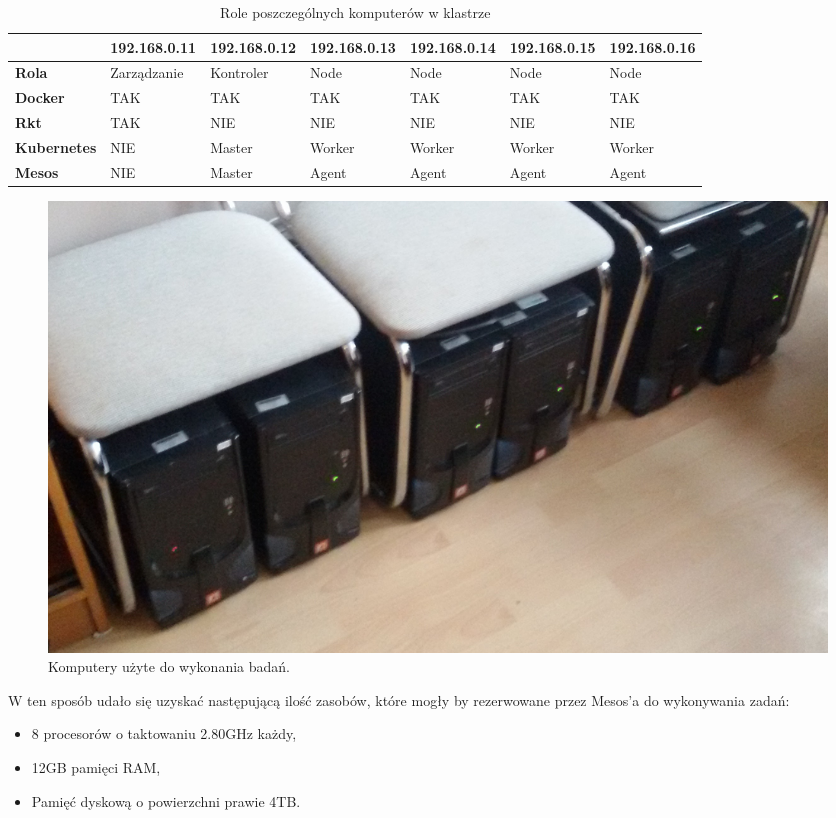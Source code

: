 \documentclass[10pt,a4paper,titlepage,twoside]{report}
\begin{document}
\begin{table}[!h]
\caption{Role poszczególnych komputerów w klastrze}
\label{klaster_magisterski}
\centering
\begin{tabular}{|p{2cm}|p{2cm}|p{2cm}|p{2cm}|p{2cm}|p{2cm}|p{2cm}|}
  \hline
   & 192.168.0.11 & 192.168.0.12 & 192.168.0.13 & 192.168.0.14 & 192.168.0.15 & 192.168.0.16 \\
  \hline
  \textbf{Rola} & Zarządzanie & Kontroler & Node & Node & Node & Node \\
  \hline
  \textbf{Docker} & TAK & TAK & TAK & TAK & TAK & TAK \\
  \hline
  \textbf{Rkt} & TAK & NIE & NIE & NIE & NIE & NIE \\
  \hline
  \textbf{Kubernetes} & NIE & Master & Worker & Worker & Worker & Worker \\
  \hline
  \textbf{Mesos} & NIE & Master & Agent & Agent & Agent & Agent \\
  \hline
\end{tabular}
\end{table}

\begin{figure}[!h]
	\centering
	\includegraphics[scale=0.15]{pics/20170308_163141.jpg}
	\caption{Komputery użyte do wykonania badań.}
	\label{klaster_magisterski_photo}
\end{figure}

W ten sposób udało się uzyskać następującą ilość zasobów, które mogły by rezerwowane przez Mesos'a do wykonywania zadań:
\begin{itemize}
\item 8 procesorów o taktowaniu 2.80GHz każdy,
\item 12GB pamięci RAM,
\item Pamięć dyskową o powierzchni prawie 4TB.
\end{itemize}
\end{document}
